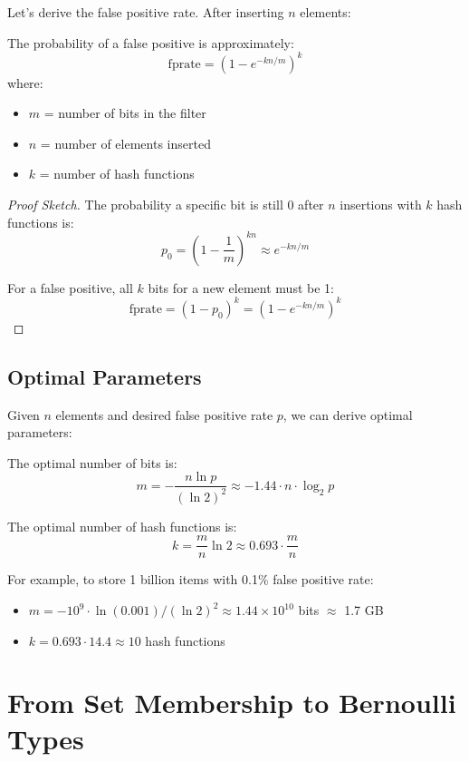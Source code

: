 Let's derive the false positive rate. After inserting $n$ elements:

\begin{theorem}
The probability of a false positive is approximately:
\[
\text{fprate} = \left(1 - e^{-kn/m}\right)^k
\]
where:
\begin{itemize}
\item $m$ = number of bits in the filter
\item $n$ = number of elements inserted
\item $k$ = number of hash functions
\end{itemize}
\end{theorem}

\begin{proof}[Proof Sketch]
The probability a specific bit is still 0 after $n$ insertions with $k$ hash functions is:
\[
p_0 = \left(1 - \frac{1}{m}\right)^{kn} \approx e^{-kn/m}
\]

For a false positive, all $k$ bits for a new element must be 1:
\[
\text{fprate} = (1 - p_0)^k = \left(1 - e^{-kn/m}\right)^k
\]
\end{proof}

\subsection{Optimal Parameters}

Given $n$ elements and desired false positive rate $p$, we can derive optimal parameters:

\begin{theorem}
The optimal number of bits is:
\[
m = -\frac{n \ln p}{(\ln 2)^2} \approx -1.44 \cdot n \cdot \log_2 p
\]

The optimal number of hash functions is:
\[
k = \frac{m}{n} \ln 2 \approx 0.693 \cdot \frac{m}{n}
\]
\end{theorem}

For example, to store 1 billion items with 0.1\% false positive rate:
\begin{itemize}
\item $m = -10^9 \cdot \ln(0.001) / (\ln 2)^2 \approx 1.44 \times 10^{10}$ bits $\approx$ 1.7 GB
\item $k = 0.693 \cdot 14.4 \approx 10$ hash functions
\end{itemize}

\section{From Set Membership to Bernoulli Types}

